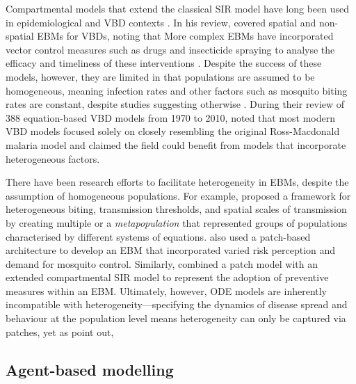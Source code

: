 Compartmental models that extend the classical SIR model have long been used in epidemiological and VBD contexts \cite{tang_review_2020}. In his review, \citet{cosner_models_2015} covered spatial and non-spatial EBMs for VBDs, noting that  More complex EBMs have incorporated vector control measures such as drugs and insecticide spraying to analyse the efficacy and timeliness of these interventions \cite{reiner_systematic_2013}. Despite the success of these models, however, they are limited in that populations are assumed to be homogeneous, meaning infection rates and other factors such as mosquito biting rates are constant, despite studies suggesting otherwise \cite{perkins_heterogeneity_2013}. During their review of 388 equation-based VBD models from 1970 to 2010, \citet{reiner_systematic_2013} noted that most modern VBD models focused solely on  closely resembling the original Ross-Macdonald malaria model \cite{ross_report_1908,macdonald_epidemiology_1957} and claimed the field could benefit from models that incorporate heterogeneous factors.

There have been research efforts to facilitate heterogeneity in EBMs, despite the assumption of homogeneous populations. For example, \citet{perkins_heterogeneity_2013} proposed a framework for heterogeneous biting, transmission thresholds, and spatial scales of transmission by creating multiple  or a \textit{metapopulation} that represented groups of populations characterised by different systems of equations. \citet{suarez_generic_2020} also used a patch-based architecture to develop an EBM that incorporated varied risk perception and demand for mosquito control. Similarly, \citet{roosa_general_2022} combined a patch model with an extended compartmental SIR model to represent the adoption of preventive measures within an EBM. Ultimately, however, ODE models are inherently incompatible with heterogeneity---specifying the dynamics of disease spread and behaviour at the population level means heterogeneity can only be captured via patches, yet as \citet{bedson_review_2021} point out, 


\subsection{Agent-based modelling}

